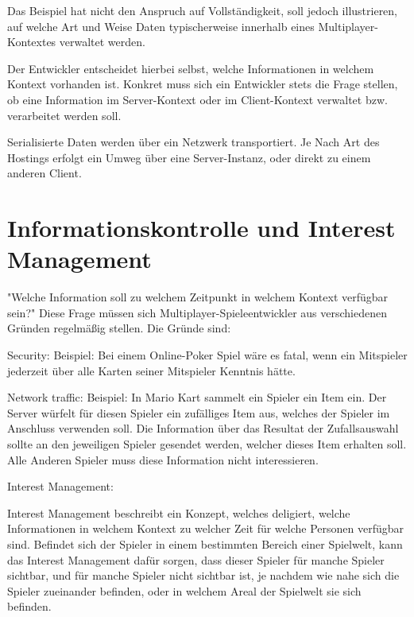 Das Beispiel hat nicht den Anspruch auf Vollständigkeit, soll jedoch illustrieren, auf welche Art und Weise Daten typischerweise innerhalb eines Multiplayer-Kontextes verwaltet werden.

Der Entwickler entscheidet hierbei selbst, welche Informationen in welchem Kontext vorhanden ist. Konkret muss sich ein Entwickler stets die Frage stellen, ob eine Information im Server-Kontext oder im Client-Kontext verwaltet bzw. verarbeitet werden soll.

Serialisierte Daten werden über ein Netzwerk transportiert. Je Nach Art des Hostings erfolgt ein Umweg über eine Server-Instanz, oder direkt zu einem anderen Client. \cite{Smed.2002c}

\section{Informationskontrolle und Interest Management}


"Welche Information soll zu welchem Zeitpunkt in welchem Kontext verfügbar sein?" Diese Frage müssen sich Multiplayer-Spieleentwickler aus verschiedenen Gründen regelmäßig stellen.
Die Gründe sind:

Security:
Beispiel: Bei einem Online-Poker Spiel wäre es fatal, wenn ein Mitspieler jederzeit über alle Karten seiner Mitspieler Kenntnis hätte. 

Network traffic:
Beispiel: In Mario Kart sammelt ein Spieler ein Item ein. Der Server würfelt für diesen Spieler ein zufälliges Item aus, welches der Spieler im Anschluss verwenden soll. Die Information über das Resultat der Zufallsauswahl sollte an den jeweiligen Spieler gesendet werden, welcher dieses Item erhalten soll. Alle Anderen Spieler muss diese Information nicht interessieren. 

Interest Management:

Interest Management beschreibt ein Konzept, welches deligiert, welche Informationen in welchem Kontext zu welcher Zeit für welche Personen verfügbar sind. Befindet sich der Spieler in einem bestimmten Bereich einer Spielwelt, kann das Interest Management dafür sorgen, dass dieser Spieler für manche Spieler sichtbar, und für manche Spieler nicht sichtbar ist, je nachdem wie nahe sich die Spieler zueinander befinden, oder in welchem Areal der Spielwelt sie sich befinden.

